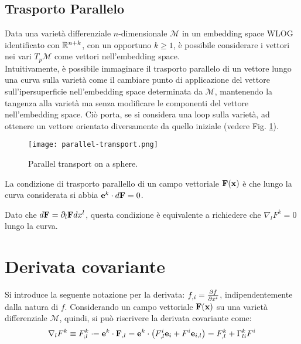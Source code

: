 \subsection{Trasporto Parallelo}

Data una varietà differenziale $ n $-dimensionale $ \mathcal{M} $ in un embedding space WLOG identificato con $ \mathbb{R}^{n+k} $, con un opportuno $ k \ge 1 $, è possibile considerare i vettori nei vari $ T_p\mathcal{M} $ come vettori nell'embedding space.\\
Intuitivamente, è possibile immaginare il trasporto parallelo di un vettore lungo una curva sulla varietà come il cambiare punto di applicazione del vettore sull'ipersuperficie nell'embedding space determinata da $ \mathcal{M} $, mantenendo la tangenza alla varietà ma senza modificare le componenti del vettore nell'embedding space. Ciò porta, se si considera una loop sulla varietà, ad ottenere un vettore orientato diversamente da quello iniziale (vedere Fig. \ref{par-tr}).
\begin{figure}
	\centering
	\texttt{[image: parallel-transport.png]}
	\caption{Parallel transport on a sphere.}
	\label{par-tr}
\end{figure}

\begin{proposition}
	La condizione di trasporto parallello di un campo vettoriale $ \mathbf{F}(\mathbf{x}) $ è che lungo la curva considerata si abbia $ \mathbf{e}^k \cdot d\mathbf{F} = 0 $.
\end{proposition}
Dato che $ d\mathbf{F} = \partial_l \mathbf{F} dx^l $, questa condizione è equivalente a richiedere che $ \nabla_l F^k = 0 $ lungo la curva.

\section{Derivata covariante}

Si introduce la seguente notazione per la derivata: $ f_{,i} = \frac{\partial f}{\partial x^i} $, indipendentemente dalla natura di $ f $.
Considerando un campo vettoriale $ \mathbf{F}(\mathbf{x}) $ su una varietà differenziale $ \mathcal{M} $, quindi, si può riscrivere la derivata covariante come:
\begin{equation}
	\nabla_l F^k \equiv F^k_{;l} \defeq \ve{e}^k \cdot \ve{F}_{,l} = \ve{e}^k \cdot \left( F^i_{,l} \ve{e}_i + F^i \ve{e}_{i,l} \right) = F^k_{,l} + \Gamma^k_{li} F^i
	\label{eq:4.7}
\end{equation}

